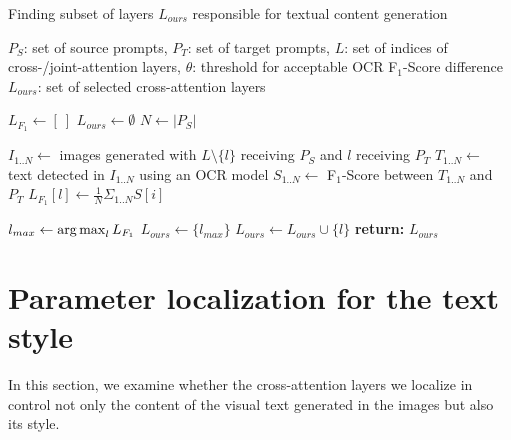 \begin{algorithm}
    \caption{Finding subset of layers $L_{ours}$ responsible for textual content generation}
    \begin{algorithmic} \label{alg:localization}
        \Require $P_S$: set of source prompts, $P_T$: set of target prompts, $L$: set of indices of cross-/joint-attention layers, $\theta$: threshold for acceptable OCR F$_{1}$-Score difference
        \Ensure $L_{ours}$: set of selected cross-attention layers

        \State $L_{F_1} \leftarrow [\ ]$ 
        \State $L_{ours} \leftarrow \emptyset$
        \State $N \leftarrow |P_S|$

         
        \State $I_{1..N} \leftarrow$ images generated with $L \setminus \{l\}$ receiving $P_S$ and $l$ receiving $P_T$
        \State $T_{1..N} \leftarrow$ text detected in $I_{1..N}$ using an OCR model
        \State $S_{1..N} \leftarrow$ F$_{1}$-Score between $T_{1..N}$ and $P_T$
        \State $L_{F_1}[l] \leftarrow {\frac{1}{N}} \Sigma_{1..N} S[i]$
        \EndFor

        \State $l_{max} \leftarrow \operatorname*{arg\,max}_l L_{F_1}$
        \State $L_{ours} \leftarrow \{l_{max}\}$
         
        \State $L_{ours} \leftarrow L_{ours} \cup \{l\}$
        \EndIf
        \EndFor
        \State \textbf{return:} $L_{ours}$
    \end{algorithmic}
\end{algorithm}

\section{Parameter localization for the text style}\label{app:text_style}
In this section, we examine whether the cross-attention layers we localize in~ control not only the content of the visual text generated in the images but also its style.

